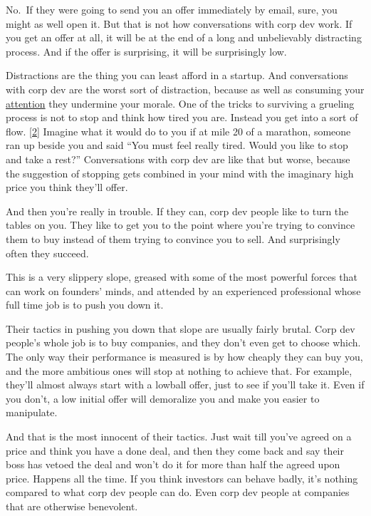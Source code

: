 No.~If they were going to send you an offer immediately by email, sure,
you might as well open it. But that is not how conversations with corp
dev work. If you get an offer at all, it will be at the end of a long
and unbelievably distracting process. And if the offer is surprising, it
will be surprisingly low.

Distractions are the thing you can least afford in a startup. And
conversations with corp dev are the worst sort of distraction, because
as well as consuming your \href{top.html}{attention} they undermine your
morale. One of the tricks to surviving a grueling process is not to stop
and think how tired you are. Instead you get into a sort of flow.
{[}\hyperref[f2n]{2}{]} Imagine what it would do to you if at mile 20 of
a marathon, someone ran up beside you and said ``You must feel really
tired. Would you like to stop and take a rest?'' Conversations with corp
dev are like that but worse, because the suggestion of stopping gets
combined in your mind with the imaginary high price you think they'll
offer.

And then you're really in trouble. If they can, corp dev people like to
turn the tables on you. They like to get you to the point where you're
trying to convince them to buy instead of them trying to convince you to
sell. And surprisingly often they succeed.

This is a very slippery slope, greased with some of the most powerful
forces that can work on founders' minds, and attended by an experienced
professional whose full time job is to push you down it.

Their tactics in pushing you down that slope are usually fairly brutal.
Corp dev people's whole job is to buy companies, and they don't even get
to choose which. The only way their performance is measured is by how
cheaply they can buy you, and the more ambitious ones will stop at
nothing to achieve that. For example, they'll almost always start with a
lowball offer, just to see if you'll take it. Even if you don't, a low
initial offer will demoralize you and make you easier to manipulate.

And that is the most innocent of their tactics. Just wait till you've
agreed on a price and think you have a done deal, and then they come
back and say their boss has vetoed the deal and won't do it for more
than half the agreed upon price. Happens all the time. If you think
investors can behave badly, it's nothing compared to what corp dev
people can do. Even corp dev people at companies that are otherwise
benevolent.

